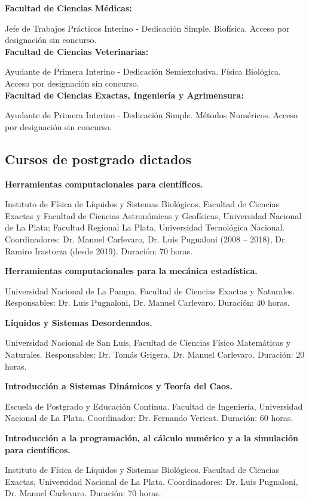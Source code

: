 \textbf{Facultad de Ciencias Médicas:}

 Jefe de Trabajos Prácticos Interino - Dedicación Simple. Biofísica. Acceso por designación sin concurso. \\

\textbf{Facultad de Ciencias Veterinarias:}

 Ayudante de Primera Interino - Dedicación Semiexclusiva. Física Biológica. Acceso por designación sin concurso.\\

\textbf{Facultad de Ciencias Exactas, Ingeniería y Agrimensura:}

 Ayudante de Primera Interino - Dedicación Simple. Métodos Numéricos. Acceso por designación sin concurso.

\subsection{Cursos de postgrado dictados}

 \textbf{Herramientas computacionales para científicos.}

 Instituto de Física de Líquidos y Sistemas Biológicos. Facultad de Ciencias Exactas y Facultad de Ciencias Astronómicas y Geofísicas, Universidad Nacional de La Plata; Facultad Regional La Plata, Universidad Tecnológica Nacional. Coordinadores: Dr. Manuel Carlevaro, Dr. Luis Pugnaloni (2008 -- 2018), Dr. Ramiro Irastorza (desde 2019). Duración: 70 horas.

  \textbf{Herramientas computacionales para la mecánica estadística.}

Universidad Nacional de La Pampa, Facultad de Ciencias Exactas y Naturales. Responsables: Dr. Luis Pugnaloni, Dr. Manuel Carlevaro. Duración: 40 horas.

 
 \textbf{Líquidos y Sistemas Desordenados.}

Universidad Nacional de San Luis, Facultad de Ciencias Físico Matemáticas y Naturales. Responsables: Dr. Tomás Grigera, Dr. Manuel Carlevaro. Duración: 20 horas.


  \textbf{Introducción a Sistemas Dinámicos y Teoría del Caos.}
 
 Escuela de Postgrado y Educación Continua. Facultad de Ingeniería, Universidad Nacional de La Plata. Coordinador: Dr. Fernando Vericat. Duración: 60 horas.
 
  \textbf{Introducción a la programación, al cálculo numérico y a la simulación para científicos.}
 
 Instituto de Física de Líquidos y Sistemas Biológicos. Facultad de Ciencias Exactas, Universidad Nacional de La Plata. Coordinadores: Dr. Luis Pugnaloni, Dr. Manuel Carlevaro. Duración: 70 horas.
